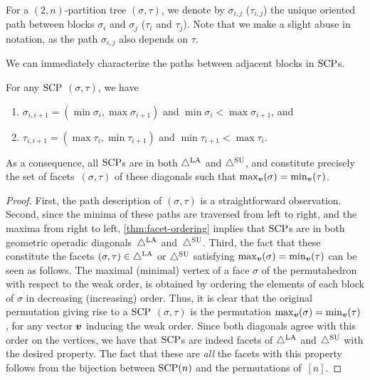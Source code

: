 \begin{notation}
For a $(2,n)$-partition tree $(\sigma,\tau)$, we denote by $\sigma_{i,j}$ (\resp $\tau_{i,j}$) the unique oriented path between blocks $\sigma_{i}$ and $\sigma_j$ (\resp $\tau_{i}$ and $\tau_j$).
Note that we make a slight abuse in notation, as the path $\sigma_{i,j}$ also depends on $\tau$.
\end{notation}

We can immediately characterize the paths between adjacent blocks in $\mathrm{SCP}$s.

\begin{proposition} 
\label{lem:SCP-path-desc}
For any $\mathrm{SCP}$ $(\sigma,\tau)$, we have
\begin{enumerate}
\item $ \sigma_{i,i+1} = ( \min \sigma_i, \max \sigma_{i+1} )$ and $\min \sigma_i< \max \sigma_{i+1}$, and
\item $  \tau_{i,i+1} =  ( \max \tau_i, \min \tau_{i+1} )$ and $\min \tau_{i+1}< \max \tau_{i}$.
\end{enumerate}
As a consequence, all $\mathrm{SCP}$s are in both $\triangle^{\mathrm{LA}}$ and $\triangle^{\mathrm{SU}}$, and constitute precisely the set of facets~$(\sigma,\tau)$ of these diagonals such that $\max_{\boldsymbol{v}}(\sigma) = \min_{\boldsymbol{v}}(\tau)$.
\end{proposition}
\begin{proof}
First, the path description of $(\sigma,\tau)$ is a straightforward observation. 
Second, since the minima of these paths are traversed from left to right, and the maxima from right to left, \cref{thm:facet-ordering} implies that $\mathrm{SCP}$s are in both geometric operadic diagonals~$\triangle^{\mathrm{LA}}$ and~$\triangle^{\mathrm{SU}}$.
Third, the fact that these constitute the facets $(\sigma,\tau) \in \triangle^{\mathrm{LA}}$ or $\triangle^{\mathrm{SU}}$ satisfying $\max_{\boldsymbol{v}}(\sigma) = \min_{\boldsymbol{v}}(\tau)$ can be seen as follows.
The maximal (\resp minimal) vertex of a face $\sigma$ of the permutahedron with respect to the weak order, is obtained by ordering the elements of each block of $\sigma$ in decreasing (\resp increasing) order. 
Thus, it is clear that the original permutation giving rise to a $\mathrm{SCP}$ $(\sigma,\tau)$ is the permutation $\max_{\boldsymbol{v}}(\sigma)=\min_{\boldsymbol{v}}(\tau)$, for any vector $\boldsymbol{v}$ inducing the weak order.
Since both diagonals agree with this order on the vertices, we have that $\mathrm{SCP}$s are indeed facets of $\triangle^{\mathrm{LA}}$ and $\triangle^{\mathrm{SU}}$ with the desired property. 
The fact that these are \emph{all} the facets with this property follows from the bijection between $\mathrm{SCP}(n)$ and the permutations of~$[n]$.
\end{proof}


